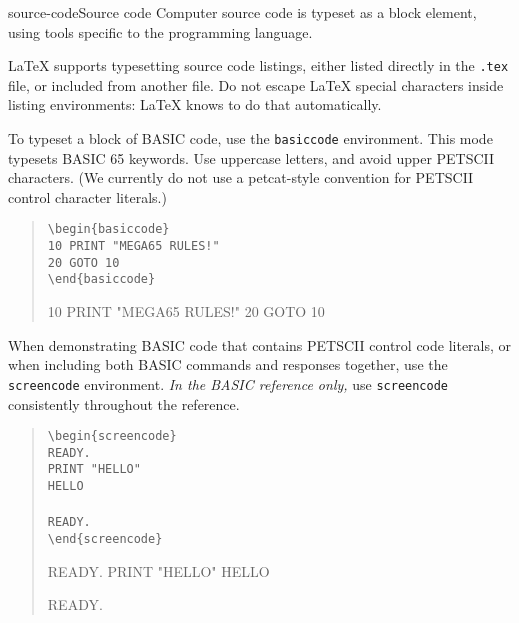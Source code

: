 \begin{sgentry}{source-code}{Source code}
    Computer source code is typeset as a block element, using tools specific to the programming language.

    LaTeX supports typesetting source code listings, either listed directly in the \texttt{.tex} file, or included from another file. Do not escape LaTeX special characters inside listing environments: LaTeX knows to do that automatically.

    To typeset a block of BASIC code, use the \texttt{basiccode} environment. This mode typesets BASIC 65 keywords. Use uppercase letters, and avoid upper PETSCII characters. (We currently do not use a petcat-style convention for PETSCII control character literals.)

    \begin{quote}
        \texttt{{\textbackslash}begin\{basiccode\} \\
        10 PRINT "MEGA65 RULES!" \\
        20 GOTO 10 \\
        {\textbackslash}end\{basiccode\}}

        \hrulefill

\begin{basiccode}
10 PRINT "MEGA65 RULES!"
20 GOTO 10
\end{basiccode}
    \end{quote}

    When demonstrating BASIC code that contains PETSCII control code literals, or when including both BASIC commands and responses together, use the \texttt{screencode} environment. \emph{In the BASIC reference only,} use \texttt{screencode} consistently throughout the reference.

    \begin{quote}
        \texttt{{\textbackslash}begin\{screencode\} \\
        READY. \\
        PRINT "HELLO" \\
        HELLO \\
        \\
        READY. \\
        {\textbackslash}end\{screencode\}}

        \hrulefill

\begin{screencode}
READY.
PRINT "HELLO"
HELLO

READY.
\end{screencode}
    \end{quote}


\end{sgentry}
